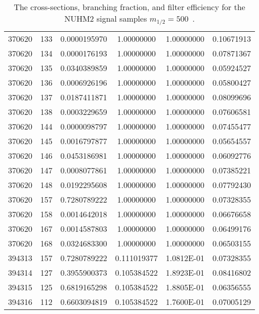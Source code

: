 \begin{table}[htp]
{{\begin{tabular}{cccccc}
                370620 & 133         & 0.0000195970         & 1.00000000  & 1.00000000        & 0.10671913\\
                370620 & 134         & 0.0000176193         & 1.00000000  & 1.00000000        & 0.07871367\\
                370620 & 135         & 0.0340389859         & 1.00000000  & 1.00000000        & 0.05924527\\
                370620 & 136         & 0.0006926196         & 1.00000000  & 1.00000000        & 0.05800427\\
                370620 & 137         & 0.0187411871         & 1.00000000  & 1.00000000        & 0.08099696\\
                370620 & 138         & 0.0003229659         & 1.00000000  & 1.00000000        & 0.07606581\\
                370620 & 144         & 0.0000098797         & 1.00000000  & 1.00000000        & 0.07455477\\
                370620 & 145         & 0.0016797877         & 1.00000000  & 1.00000000        & 0.05654557\\
                370620 & 146         & 0.0453186981         & 1.00000000  & 1.00000000        & 0.06092776\\
                370620 & 147         & 0.0008077861         & 1.00000000  & 1.00000000        & 0.07385221\\
                370620 & 148         & 0.0192295608         & 1.00000000  & 1.00000000        & 0.07792430\\
                370620 & 157         & 0.7280789222         & 1.00000000  & 1.00000000        & 0.07328355\\
                370620 & 158         & 0.0014642018         & 1.00000000  & 1.00000000        & 0.06676658\\
                370620 & 167         & 0.0014587803         & 1.00000000  & 1.00000000        & 0.06499176\\
                370620 & 168         & 0.0324683300         & 1.00000000  & 1.00000000        & 0.06503155\\
                394313 & 157         & 0.7280789222         & 0.111019377 & 1.0812E-01        & 0.07328355\\
                394314 & 127         & 0.3955900373         & 0.105384522 & 1.8923E-01        & 0.08416802\\
                394315 & 125         & 0.6819165298         & 0.105384522 & 1.8805E-01        & 0.06356555\\
                394316 & 112         & 0.6603094819         & 0.105384522 & 1.7600E-01        & 0.07005129\\
                \hline
                \hline
            \end{tabular}
        }
    }
    \caption{The cross-sections, branching fraction, and filter efficiency for the NUHM2 signal samples $m_{1/2} = 500$~{\GeV}.}
    \label{tab:app_xsec_m12_500}
\end{table}%

